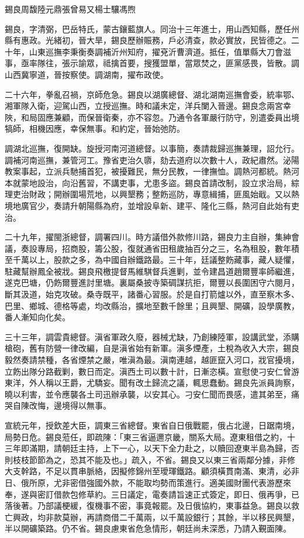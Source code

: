 
\begin{pinyinscope}
錫良周馥陸元鼎張曾易又楊士驤馮煦

錫良，字清弼，巴岳特氏，蒙古鑲藍旗人。同治十三年進士，用山西知縣，歷任州縣有惠政。光緒初，晉大旱，錫良歷辦賑務，戶必清查，款必實放，民皆德之。二十年，山東巡撫李秉衡奏調補沂州知府，擢兗沂曹濟道。抵任，值單縣大刀會滋事，亟率隊往，張示諭眾，祗擒首要，搜獲盟單，當眾焚之，匪黨感畏，皆散。調山西冀寧道，晉按察使。調湖南，擢布政使。

二十六年，拳亂召禍，京師危急。錫良以湖廣總督、湖北湖南巡撫會委，統率鄂、湘軍隊入衛，迎駕山西，立授巡撫。時和議未定，洋兵闌入晉邊。錫良念兩宮幸陜，和局固應兼顧，而保晉衛秦，亦不容忽。乃通令各軍嚴行防守，別遣委員出境犒師，相機因應，幸保無事。和約定，晉始弛防。

調湖北巡撫，復開缺。旋授河南河道總督。以事簡，奏請裁歸巡撫兼理，詔允行。調補河南巡撫，兼管河工。豫省吏治久隳，劾去道府以次數十人，政紀肅然。泌陽教案事起，立派兵馳捕首犯，被擾難民，無分民教，一律撫恤。調熱河都統。熱河本就蒙地設治，向沿舊習，不講吏事，尤患多盜。錫良首請改制，設立求治局，綜理吏治財政；開辦圍場荒地，以興墾務；整飭巡防，專意緝捕，匪風始戢。又以熱境地廣官少，奏請升朝陽縣為府，並增設阜新、建平、隆化三縣，熱河自此始有吏治。

二十九年，擢閩浙總督，調署四川。時方議借外款修川路，錫良力主自辦，集紳會議，奏設專局，招商股，籌公股，復就通省田租歲抽百分之三，名為租股，數年積至千萬以上，股款之多，為中國自辦鐵路最。三十年，廷議整飭藏事，藏人疑懼，駐藏幫辦鳳全被戕。錫良飛檄提督馬維騏督兵進剿，並令建昌道趙爾豐率師繼進，遂克巴塘，仍飭爾豐進討里塘。裏屬桑披寺築碉謀抗拒，爾豐以長圍困守六閱月，斷其汲道，始克攻破。桑寺既平，諸番心習服。於是自打箭爐以外，直至察木多、巴里、鄉城、德格等處，均改縣治，擴地至數千餘里；且興墾、開礦，設學廣教，番人漸知向化矣。

三十三年，調雲貴總督。滇省軍政久廢，器械尤缺，乃創練陸軍，設講武堂，添購槍砲，舊有防營一律改編，自是滇省始有新軍。滇多煙產，土稅為收入大宗，錫良毅然奏請禁種，各省煙禁之嚴，唯滇為最。滇南連越，越匪竄入河口，戕官擾境，立飭出隊分路截剿，數日而定。滇西土司以數十計，日漸恣橫。宣慰使刁安仁曾游東洋，外人稱以王爵，尤驕妄。聞有改土歸流之議，輒思蠢動。錫良先派員詢察，曉以利害，並令應襲各土司迅辦承襲，以安其心。刁安仁聞而畏感，遣其弟至，痛哭自陳改悔，邊境得以無事。

宣統元年，授欽差大臣，調東三省總督。東省自日俄戰罷，俄占北邊，日踞南境，局勢日危。錫良蒞任，即疏陳：「東三省逼邇京畿，關系大局。遼東租借之約，十三年即滿期，請朝廷主持，上下一心，以天下全力赴之，以贖回遼東半島為歸，否則枝枝節節為之，恐其不能及也。」疏入，不省。錫良又以東三省兩鄰分據，非修大支幹路，不足以貫串脈絡，因擬修錦州至璦琿鐵路。顧須橫貫南滿、東清，必非日、俄所原，尤非密借強國外款，不能取均勢而策進行。適美國財團代表游歷來奉，遂與密訂借款包修草約。三日議定，電奏請旨速正式簽定，即日、俄再爭，已落後著。乃部議梗緩，復機事不密，事竟報罷。及日俄協約，東事益急。錫良以救亡興政，均非款莫辦，再請商借二千萬兩，以千萬設銀行；其餘，半以移民興墾，半以開礦築路。仍不省。錫良慮東省危急情形，朝廷尚未深悉，乃請入覲面陳。


\end{pinyinscope}
